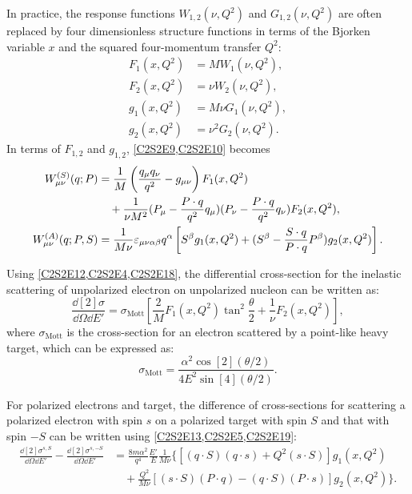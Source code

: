 In practice, the response functions $W_{1,2}(\nu,Q^2)$ and $G_{1,2}(\nu,Q^2)$ are often replaced by four dimensionless structure functions in terms of the Bjorken variable $x$ and the squared four-momentum transfer $Q^2$:
\begin{align} \label{C2S2E14}
F_1(x,Q^2) & = MW_1(\nu,Q^2), \\  \label{C2S2E15}
F_2(x,Q^2) & = \nu W_2(\nu,Q^2), \\  \label{C2S2E16}
g_1(x,Q^2) & = M \nu G_1(\nu,Q^2), \\  \label{C2S2E17}
g_2(x,Q^2) & = \nu^2G_2(\nu,Q^2).
\end{align}
In terms of $F_{1,2}$ and  $g_{1,2}$, \cref{C2S2E9,C2S2E10} becomes
\begin{align}
W_{\mu\nu}^{(S)}(q;P) & = \frac{1}{M}\left(\frac{q_\mu q_\nu}{q^2}-g_{\mu\nu}\right)F_1(x,Q^2) \notag \\ \label{C2S2E18}
& \quad +\frac{1}{\nu M^2}(P_\mu-\frac{P\cdot q}{q^2}q_\mu)(P_\nu-\frac{P\cdot q}{q^2}q_\nu)F_2(x,Q^2), \\ \label{C2S2E19}
W_{\mu\nu}^{(A)}(q;P,S) & = \frac{1}{M\nu}\varepsilon_{\mu\nu\alpha\beta}q^\alpha\left[S^\beta g_1(x,Q^2)+(S^\beta-\frac{S\cdot q}{P\cdot q}P^\beta)g_2(x,Q^2)\right].
\end{align}

Using \cref{C2S2E12,C2S2E4,C2S2E18}, the differential cross-section for the inelastic scattering of unpolarized electron on unpolarized nucleon can be written as:
\begin{equation} \label{C2S2E20}
\frac{\dd[2]{\sigma}}{\dd{\Omega}\dd{E'}} = \sigma_{\mathrm{Mott}}\left[\frac{2}{M}F_1(x,Q^2)\tan^2\frac{\theta}{2}+\frac{1}{\nu}F_2(x,Q^2)\right],
\end{equation}
where $\sigma_{\mathrm{Mott}}$ is the cross-section for an electron scattered by a point-like heavy target, which can be expressed as:
\begin{equation} \label{C2S2E21}
\sigma_{\mathrm{Mott}} = \frac{\alpha^2\cos[2](\theta/2)}{4E^2\sin[4](\theta/2)}.
\end{equation}

For polarized electrons and target, the difference of cross-sections for scattering a polarized electron with spin $s$ on a polarized target with spin $S$ and that with spin $-S$ can be written using \cref{C2S2E13,C2S2E5,C2S2E19}:
\begin{equation} \label{C2S2E22}
\begin{split}
\frac{\dd[2]{\sigma}^{s,S}}{\dd{\Omega}\dd{E'}}-\frac{\dd[2]{\sigma}^{s,-S}}{\dd{\Omega}\dd{E'}} & = \frac{8m\alpha^2}{q^4}\frac{E'}{E}\frac{1}{M\nu}\Big\{[(q\cdot S)(q\cdot s)+Q^2(s\cdot S)]g_1(x,Q^2) \\
& \quad +\frac{Q^2}{M\nu}[(s\cdot S)(P\cdot q)-(q\cdot S)(P\cdot s)]g_2(x,Q^2)\Big\}.
\end{split}
\end{equation}

